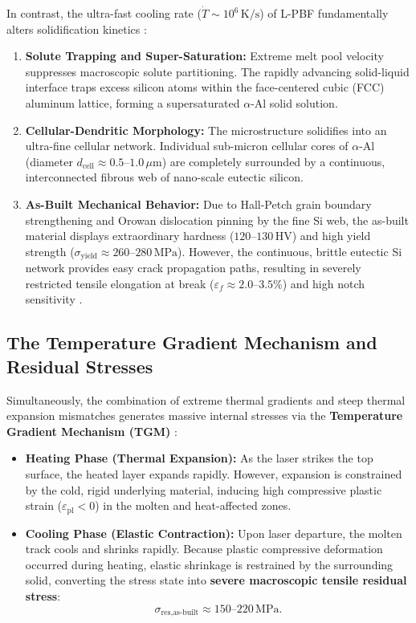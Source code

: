 In contrast, the ultra-fast cooling rate ($\dot{T} \sim 10^6\,\text{K/s}$) of L-PBF fundamentally alters solidification kinetics \cite{thijs2013,trevisan2017}:
\begin{enumerate}
\item \textbf{Solute Trapping and Super-Saturation:} Extreme melt pool velocity suppresses macroscopic solute partitioning. The rapidly advancing solid-liquid interface traps excess silicon atoms within the face-centered cubic (FCC) aluminum lattice, forming a supersaturated $\alpha$-Al solid solution.
\item \textbf{Cellular-Dendritic Morphology:} The microstructure solidifies into an ultra-fine cellular network. Individual sub-micron cellular cores of $\alpha$-Al (diameter $d_{\text{cell}} \approx 0.5\text{--}1.0\,\mu\text{m}$) are completely surrounded by a continuous, interconnected fibrous web of nano-scale eutectic silicon.
\item \textbf{As-Built Mechanical Behavior:} Due to Hall-Petch grain boundary strengthening and Orowan dislocation pinning by the fine Si web, the as-built material displays extraordinary hardness ($120\text{--}130\,\text{HV}$) and high yield strength ($\sigma_{\text{yield}} \approx 260\text{--}280\,\text{MPa}$). However, the continuous, brittle eutectic Si network provides easy crack propagation paths, resulting in severely restricted tensile elongation at break ($\varepsilon_f \approx 2.0\text{--}3.5\%$) and high notch sensitivity \cite{kempen2012}.
\end{enumerate}

\subsection{The Temperature Gradient Mechanism and Residual Stresses}
Simultaneously, the combination of extreme thermal gradients and steep thermal expansion mismatches generates massive internal stresses via the \textbf{Temperature Gradient Mechanism (TGM)} \cite{merkt2015,trevisan2017}:
\begin{itemize}
\item \textbf{Heating Phase (Thermal Expansion):} As the laser strikes the top surface, the heated layer expands rapidly. However, expansion is constrained by the cold, rigid underlying material, inducing high compressive plastic strain ($\varepsilon_{\text{pl}} < 0$) in the molten and heat-affected zones.
\item \textbf{Cooling Phase (Elastic Contraction):} Upon laser departure, the molten track cools and shrinks rapidly. Because plastic compressive deformation occurred during heating, elastic shrinkage is restrained by the surrounding solid, converting the stress state into \textbf{severe macroscopic tensile residual stress}:
\begin{equation}
\sigma_{\text{res,as-built}} \approx 150\text{--}220\,\text{MPa}.
\label{eq:residual_stress_asbuilt}
\end{equation}
\end{itemize}

